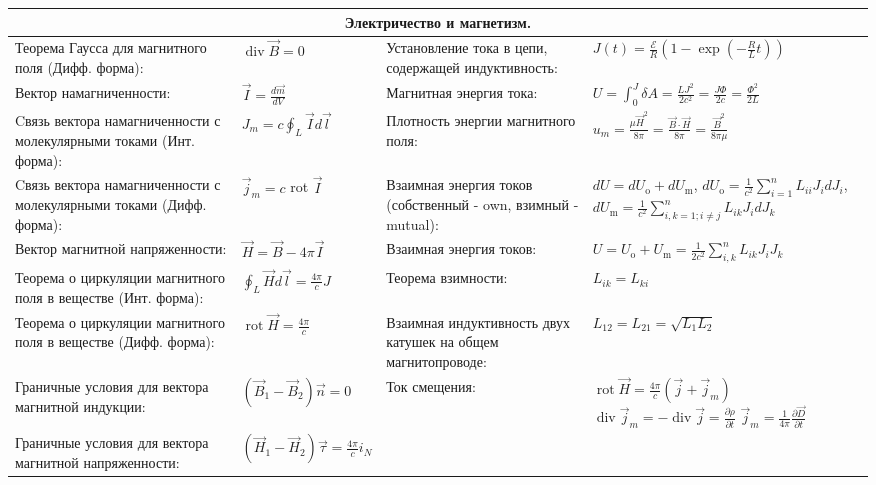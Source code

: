 \documentclass{article}
\begin{document}
\begin{tabular}{ |p{6cm}|p{3.5cm}|p{6cm}|p{3.5cm}|  }
\hline
\multicolumn{4}{|c|}{Электричество и магнетизм.} \\
\hline
Теорема Гаусса для магнитного поля (Дифф. форма): &
$\operatorname{div} \vec{B}=0$ &
Установление тока в цепи, содержащей индуктивность: &
$J(t)=\frac{\mathcal{E}}{R}\left(1-\exp \left(-\frac{R}{L} t\right)\right)$ \\
\hline
Вектор намагниченности: &
$\vec{I}=\frac{d \vec{m}}{d V}$ &
Магнитная энергия тока: &
$U=\int_{0}^{J} \delta A=\frac{L J^{2}}{2 c^{2}}=\frac{J \Phi}{2 c}=\frac{\Phi^{2}}{2 L}$\\
\hline
Cвязь вектора намагниченности с молекулярными токами (Инт. форма): & 
$J_{m}=c \oint_{L} \vec{I} d {\vec l}$ &
Плотность энергии магнитного поля: &
$u_{m}=\frac{\mu \vec{H}^{2}}{8 \pi}=\frac{\vec{B} \cdot \vec{H}}{8 \pi}=\frac{\vec{B}^{2}}{8 \pi \mu}$ \\
\hline
Cвязь вектора намагниченности с молекулярными токами (Дифф. форма): & 
$\vec{j}_{m}=c$ rot $\vec{I}$ &
Взаимная энергия токов (собственный - own, взимный - mutual):&
$d U=d U_{\mathrm{o}}+d U_{\mathrm{m}}$,
$d U_{\mathrm{o}}=\frac{1}{c^{2}} \sum_{i=1}^{n} L_{i i} J_{i} d J_{i}$,
$d U_{\mathrm{m}}=\frac{1}{c^{2}} \sum_{i, k=1 ; i \neq j}^{n} L_{i k} J_{i} d J_{k}$\\
\hline
Вектор магнитной напряженности: &
$\vec{H}=\vec{B} - 4 \pi \vec{I}$ &
Взаимная энергия токов: &
$U=U_{\mathrm{o}}+U_{\mathrm{m}}=\frac{1}{2 c^{2}} \sum_{i, k}^{n} L_{i k} J_{i} J_{k}$ \\
\hline
Теорема о циркуляции магнитного поля в веществе (Инт. форма): &
$\oint_{L} \vec{H} d \vec{l}=\frac{4 \pi}{c} J$ &
Теорема взимности: &
$L_{i k}=L_{k i}$\\
\hline
Теорема о циркуляции магнитного поля в веществе (Дифф. форма): &
$\operatorname{rot} \vec{H}=\frac{4 \pi}{c}$ &
Взаимная индуктивность двух катушек на общем магнитопроводе: &
$L_{12}=L_{21}=\sqrt{L_{1} L_{2}}$\\
\hline
Граничные условия для вектора магнитной индукции: &
$\left(\vec{B}_{1}-\vec{B}_{2}\right) \vec{n}=0$ &
Ток смещения: &
$\operatorname{rot} \vec{H}=\frac{4 \pi}{c}\left(\vec{j}+\vec{j}_{m}\right)$
$\operatorname{div} \vec{j}_{m}=-\operatorname{div} \vec{j}=\frac{\partial \rho}{\partial t}$
$\vec{j}_{m}=\frac{1}{4 \pi} \frac{\partial \vec{D}}{\partial t}$\\
\hline
Граничные условия для вектора магнитной напряженности: &
$\left(\vec{H}_{1}-\vec{H}_{2}\right) \vec{\tau}= \frac{4 \pi}{c} i_{N}$&

\end{tabular}
\end{document}
